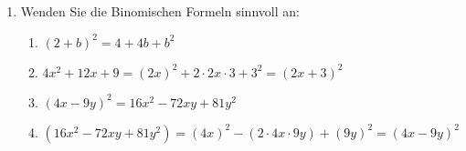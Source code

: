 \documentclass{scrartcl}
\begin{document}
	\begin{enumerate}
		\item Wenden Sie die Binomischen Formeln sinnvoll an:
		\begin{enumerate} 
			\item $(2+b)^2 = 4 + 4b + b^2$
			\item $4x^2+12x+9 = (2x)^2 + 2 \cdot 2x \cdot 3  + 3^2 = (2x +3)^2$
			\item $(4x -9y)^2 = 16x^2 - 72xy + 81y^2$
			\item $(16x^2 -72xy +81y^2) = (4x)^2 - (2 \cdot 4x \cdot 9y) + (9y)^2 = (4x -9y)^2$
		\end{enumerate}
	
		\end{enumerate} 
	
	
\end{document}
